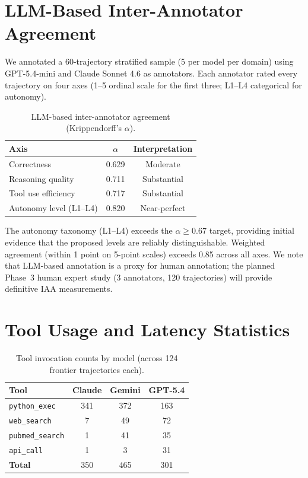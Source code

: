 \documentclass{article}
\begin{document}
\section{LLM-Based Inter-Annotator Agreement}
\label{app:iaa}

We annotated a 60-trajectory stratified sample (5 per model per domain) using GPT-5.4-mini and Claude Sonnet 4.6 as annotators. Each annotator rated every trajectory on four axes (1--5 ordinal scale for the first three; L1--L4 categorical for autonomy).

\begin{table}[h]
\caption{LLM-based inter-annotator agreement (Krippendorff's $\alpha$).}
\label{tab:iaa}
\centering\small
\begin{tabular}{lcc}
\toprule
\textbf{Axis} & \textbf{$\alpha$} & \textbf{Interpretation} \\
\midrule
Correctness & 0.629 & Moderate \\
Reasoning quality & 0.711 & Substantial \\
Tool use efficiency & 0.717 & Substantial \\
Autonomy level (L1--L4) & 0.820 & Near-perfect \\
\bottomrule
\end{tabular}
\end{table}

The autonomy taxonomy (L1--L4) exceeds the $\alpha {\geq} 0.67$ target, providing initial evidence that the proposed levels are reliably distinguishable. Weighted agreement (within 1 point on 5-point scales) exceeds 0.85 across all axes. We note that LLM-based annotation is a proxy for human annotation; the planned Phase~3 human expert study (3 annotators, 120 trajectories) will provide definitive IAA measurements.

\section{Tool Usage and Latency Statistics}
\label{app:tools}

\begin{table}[h]
\caption{Tool invocation counts by model (across 124 frontier trajectories each).}
\label{tab:tools}
\centering\small
\begin{tabular}{lccc}
\toprule
\textbf{Tool} & \textbf{Claude} & \textbf{Gemini} & \textbf{GPT-5.4} \\
\midrule
\texttt{python\_exec} & 341 & 372 & 163 \\
\texttt{web\_search} & 7 & 49 & 72 \\
\texttt{pubmed\_search} & 1 & 41 & 35 \\
\texttt{api\_call} & 1 & 3 & 31 \\
\midrule
\textbf{Total} & 350 & 465 & 301 \\
\bottomrule
\end{tabular}
\end{table}
\end{document}
